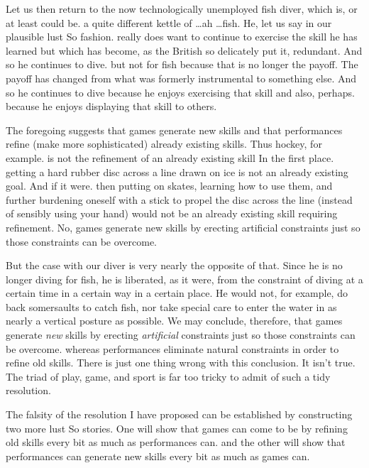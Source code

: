 \documentclass{tufte-handout}
\begin{document}
Let us then return to the now technologically unemployed fish diver, which is, or at least could be. a quite different kettle of \ldots ah \ldots fish. He, let us say in our plausible lust So fashion. really does want to continue to exercise the skill he has learned but which has become, as the British so delicately put it, redundant. And so he continues to dive. but not for fish because that is no longer the payoff. The payoff has changed from what was formerly instrumental to something else. And so he continues to dive because he enjoys exercising that skill and also, perhaps. because he enjoys displaying that skill to others. 

The foregoing suggests that games generate new skills and that performances refine (make more sophisticated) already existing skills. Thus hockey, for example. is not the refinement of an already existing skill In the first place. getting a hard rubber disc across a line drawn on ice is not an already existing goal. And if it were. then putting on skates, learning how to use them, and further burdening oneself with a stick to propel the disc across the line (instead of sensibly using your hand) would not be an already existing skill requiring refinement. No, games generate new skills by erecting artificial constraints just so those constraints can be overcome. 

But the case with our diver is very nearly the opposite of that. Since he is no longer diving for fish, he is liberated, as it were, from the constraint of diving at a certain time in a certain way in a certain place. He would not, for example, do back somersaults to catch fish, nor take special care to enter the water in as nearly a vertical posture as possible. We may conclude, therefore, that games generate \textit{new} skills by erecting \textit{artificial} constraints just so those constraints can be overcome. whereas performances eliminate natural constraints in order to refine old skills. There is just one thing wrong with this conclusion. It isn’t true. The triad of play, game, and sport is far too tricky to admit of such a tidy resolution.
 
The falsity of the resolution I have proposed can be established by constructing two more lust So stories. One will show that games can come to be by refining old skills every bit as much as performances can. and the other will show that performances can generate new skills every bit as much as games can. 
\end{document}

